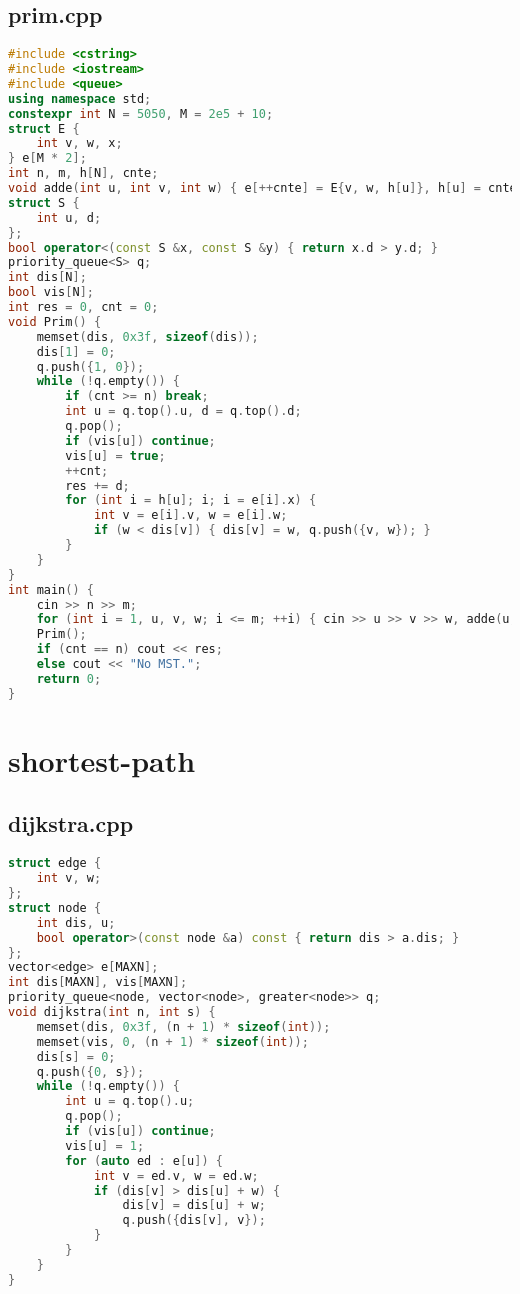 \documentclass[9pt, a4paper, oneside]{book}
\begin{document}
\subsection{prim.cpp}
\begin{lstlisting}[language={C++}]
#include <cstring>
#include <iostream>
#include <queue>
using namespace std;
constexpr int N = 5050, M = 2e5 + 10;
struct E {
    int v, w, x;
} e[M * 2];
int n, m, h[N], cnte;
void adde(int u, int v, int w) { e[++cnte] = E{v, w, h[u]}, h[u] = cnte; }
struct S {
    int u, d;
};
bool operator<(const S &x, const S &y) { return x.d > y.d; }
priority_queue<S> q;
int dis[N];
bool vis[N];
int res = 0, cnt = 0;
void Prim() {
    memset(dis, 0x3f, sizeof(dis));
    dis[1] = 0;
    q.push({1, 0});
    while (!q.empty()) {
        if (cnt >= n) break;
        int u = q.top().u, d = q.top().d;
        q.pop();
        if (vis[u]) continue;
        vis[u] = true;
        ++cnt;
        res += d;
        for (int i = h[u]; i; i = e[i].x) {
            int v = e[i].v, w = e[i].w;
            if (w < dis[v]) { dis[v] = w, q.push({v, w}); }
        }
    }
}
int main() {
    cin >> n >> m;
    for (int i = 1, u, v, w; i <= m; ++i) { cin >> u >> v >> w, adde(u, v, w), adde(v, u, w); }
    Prim();
    if (cnt == n) cout << res;
    else cout << "No MST.";
    return 0;
}\end{lstlisting}
\section{shortest-path}
\subsection{dijkstra.cpp}
\begin{lstlisting}[language={C++}]
struct edge {
    int v, w;
};
struct node {
    int dis, u;
    bool operator>(const node &a) const { return dis > a.dis; }
};
vector<edge> e[MAXN];
int dis[MAXN], vis[MAXN];
priority_queue<node, vector<node>, greater<node>> q;
void dijkstra(int n, int s) {
    memset(dis, 0x3f, (n + 1) * sizeof(int));
    memset(vis, 0, (n + 1) * sizeof(int));
    dis[s] = 0;
    q.push({0, s});
    while (!q.empty()) {
        int u = q.top().u;
        q.pop();
        if (vis[u]) continue;
        vis[u] = 1;
        for (auto ed : e[u]) {
            int v = ed.v, w = ed.w;
            if (dis[v] > dis[u] + w) {
                dis[v] = dis[u] + w;
                q.push({dis[v], v});
            }
        }
    }
}\end{lstlisting}
\end{document}
